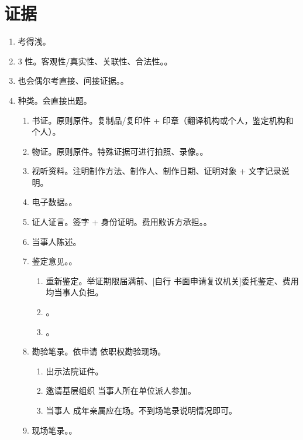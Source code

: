 \section{证据}
\begin{enumerate}
  \item 考得浅。
  \item 3 性。客观性/真实性、关联性、合法性。。
  \item 也会偶尔考直接、间接证据。。
  \item 种类。会直接出题。
        \begin{enumerate}
          \item 书证。原则原件。复制品/复印件 + 印章（翻译机构或个人，鉴定机构和个人）。
          \item 物证。原则原件。特殊证据可进行拍照、录像。。
          \item 视听资料。注明制作方法、制作人、制作日期、证明对象 + 文字记录说明。
          \item 电子数据。。
          \item 证人证言。签字 + 身份证明。费用败诉方承担。。
          \item 当事人陈述。
          \item 鉴定意见。。
                \begin{enumerate}
                  \item 重新鉴定。举证期限届满前、[自行 \hz 书面申请复议机关]委托鉴定、费用均当事人负担。
                  \item {}。
                  \item {}。
                \end{enumerate}
          \item 勘验笔录。依申请 \hz 依职权勘验现场。
                \begin{enumerate}
                  \item 出示法院证件。
                  \item 邀请基层组织 \hz 当事人所在单位派人参加。
                  \item 当事人 \hz 成年亲属应在场。不到场笔录说明情况即可。
                \end{enumerate}
          \item 现场笔录。。

\end{enumerate}
\end{enumerate}
